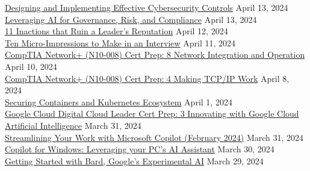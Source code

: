\documentclass[10pt]{res} %
\begin{document}
\begin{resume}
\href{https://www.linkedin.com/learning/certificates/5b68e15d0aacfb9cfede9d53ce1213175e8a0ffb59269a8c75d514fe1b57a538}{\color{blue}Designing and Implementing Effective Cybersecurity Controls} \hfill April 13, 2024 \\
\href{https://www.linkedin.com/learning/certificates/3c58d8bd10c74877c7348d0aeb4df2da47026c2034db862d1f79d17e462ff773}{\color{blue}Leveraging AI for Governance, Risk, and Compliance} \hfill April 13, 2024 \\
\href{https://www.linkedin.com/learning/certificates/1f6305296b7ed9d32df5a3da506caf4fbe8692f83b6b13dc2b1ed1e29df2d8ef}{\color{blue}11 Inactions that Ruin a Leader's Reputation} \hfill April 12, 2024 \\
\href{https://www.linkedin.com/learning/certificates/484aeb4cecebfa3fe30607f63829d07f3d58e7299a8dee3cf2d21c8dbe2d6465}{\color{blue}Ten Micro-Impressions to Make in an Interview} \hfill April 11, 2024 \\
\href{https://www.linkedin.com/learning/certificates/3f1a5649b3215a271f3cafece1fe784bee173d1a2a5c9aa328d20935a1b5b1de}{\color{blue}CompTIA Network+ (N10-008) Cert Prep: 8 Network Integration and Operation} \hfill April 10, 2024 \\
\href{https://www.linkedin.com/learning/certificates/3264f53e96b168d509bd3b91f253e42de1e27a2431d1cfa4f21e908aa0fe50c2}{\color{blue}CompTIA Network+ (N10-008) Cert Prep: 4 Making TCP/IP Work} \hfill April 8, 2024 \\
\href{https://www.linkedin.com/learning/certificates/6e0a2a57cc32d0352f477cc1d008bc0fb49ae638239ec2f8b066a7d7852c6d89}{\color{blue}Securing Containers and Kubernetes Ecosystem} \hfill April 1, 2024 \\
\href{https://www.linkedin.com/learning/certificates/11fcaea32d16f2f04c8af3532240294f7f01bd509d5f04f4411bf2fbb6ba0f8f}{\color{blue}Google Cloud Digital Cloud Leader Cert Prep: 3 Innovating with Google Cloud Artificial Intelligence} \hfill March 31, 2024 \\
\href{https://www.linkedin.com/learning/certificates/05dda61300375e17b13e13aee3ac24b08885eb8dffcae2adb31c9bd8991e624a}{\color{blue}Streamlining Your Work with Microsoft Copilot (February 2024)} \hfill March 31, 2024 \\
\href{https://www.linkedin.com/learning/certificates/0113ed8da07d7b90b1da162440ecfbcfb666146c96d6ae991d9ffee324619821}{\color{blue}Copilot for Windows: Leveraging your PC's AI Assistant} \hfill March 30, 2024 \\
\href{https://www.linkedin.com/learning/certificates/0ad6d711d350ad3ea1ee10b9b41235cd02cbb5cbd942a1985a669ab2762602f4}{\color{blue}Getting Started with Bard, Google's Experimental AI} \hfill March 29, 2024 \\

\end{resume}
\end{document}
